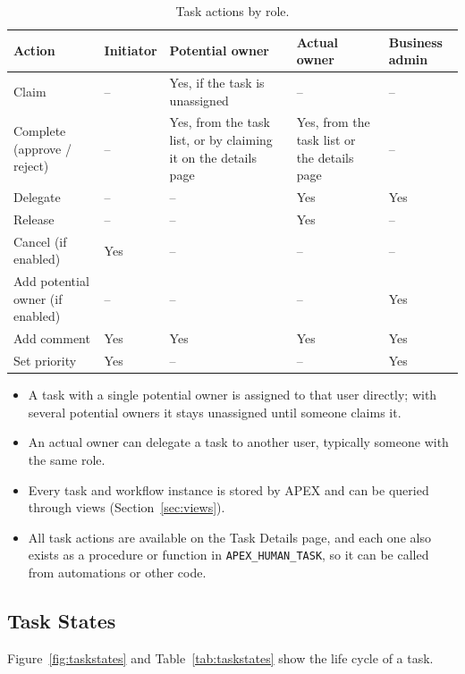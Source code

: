 \documentclass[11pt,a4paper]{article}
\begin{document}
\begin{table}[H]
\centering\small
\begin{tabularx}{\textwidth}{@{}l>{\centering\arraybackslash}p{1.6cm}LL>{\centering\arraybackslash}p{2.2cm}@{}}
\toprule
\sffamily\bfseries Action & \sffamily\bfseries Initiator & \sffamily\bfseries Potential owner & \sffamily\bfseries Actual owner & \sffamily\bfseries Business admin \\
\midrule
Claim & -- & Yes, if the task is unassigned & -- & -- \\
Complete (approve / reject) & -- & Yes, from the task list, or by claiming it on the details page & Yes, from the task list or the details page & -- \\
Delegate & -- & -- & Yes & Yes \\
Release & -- & -- & Yes & -- \\
Cancel (if enabled) & Yes & -- & -- & -- \\
Add potential owner (if enabled) & -- & -- & -- & Yes \\
Add comment & Yes & Yes & Yes & Yes \\
Set priority & Yes & -- & -- & Yes \\
\bottomrule
\end{tabularx}
\caption{Task actions by role.}
\end{table}

\begin{note}
\begin{itemize}[leftmargin=1.2em]
\item A task with a single potential owner is assigned to that user directly; with several potential owners it stays unassigned until someone claims it.
\item An actual owner can delegate a task to another user, typically someone with the same role.
\item Every task and workflow instance is stored by APEX and can be queried through views (Section~\ref{sec:views}).
\item All task actions are available on the Task Details page, and each one also exists as a procedure or function in \texttt{APEX\_HUMAN\_TASK}, so it can be called from automations or other code.
\end{itemize}
\end{note}

\subsection{Task States}
Figure~\ref{fig:taskstates} and Table~\ref{tab:taskstates} show the life cycle of a task.
\end{document}
